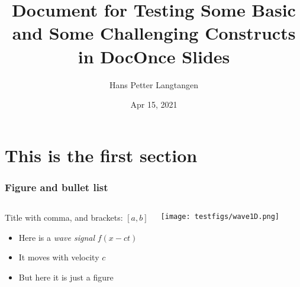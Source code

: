 \documentclass{beamer}
\begin{document}

\newcommand{\exercisesection}[1]{\subsection*{#1}}









\title{Document for Testing Some Basic and Some Challenging Constructs in DocOnce Slides}


\author{Hans Petter Langtangen}

\date{Apr 15, 2021
}

\begin{frame}
\titlepage
\end{frame}

\section[First]{This is the first section}

\begin{frame}
\frametitle{Figure and bullet list}

\begin{columns}
\pause
\begin{block}{Title with comma, and brackets: $[a,b]$ }
\footnotesize

\begin{itemize}
  \item Here is a \emph{wave signal} $f(x-ct)$

  \item It moves with velocity $c$

  \item But here it is just a figure
\end{itemize}

\noindent
\end{block}

\begin{block}{}

\vspace{6mm}

\centerline{\texttt{[image: testfigs/wave1D.png]}}

\vspace{6mm}

\end{block}

\end{columns}
\end{frame}
\end{document}
